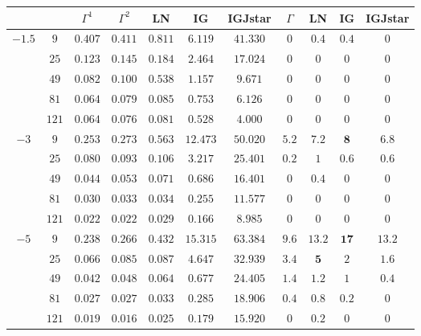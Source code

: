 \begin{table}[hbt]
\begin{tabular}{cc|ccccc|cccc}
		&  & $\Gamma^1$ & $\Gamma^2$ & LN & IG & IGJstar & $\Gamma$ & LN & IG & IGJstar  \\
		\midrule				
		\multirow{5 }{*}{$-1.5$} 
		 &  $9  $ 	&  	 $0.407$ 	&	 $0.411$ 	&	 $0.811$ 	&	 $6.119$  	&	 $41.330$ 	&	$0$	&	$0.4$	&	$0.4$	&	$0$ \\
		 &  $25 $ 	&  	 $0.123$ 	&	 $0.145$ 	&	 $0.184$ 	&	 $2.464$  	&	 $17.024$ 	&	$0$	&	$0$		&	$0$		&	$0$ \\
		 &  $49 $ 	&  	 $0.082$ 	&	 $0.100$ 	&	 $0.538$ 	&	 $1.157$  	&	 $9.671$ 	&	$0$	&	$0$		&	$0$		&	$0$ \\
		 &  $81 $ 	&  	 $0.064$ 	&	 $0.079$ 	&	 $0.085$ 	&	 $0.753$  	&	 $6.126$ 	&	$0$	&	$0$		&	$0$		&	$0$ \\
		 &  $121$ 	&  	 $0.064$ 	&	 $0.076$ 	&	 $0.081$ 	&	 $0.528$  	&	 $4.000$ 	&	$0$	&	$0$		&	$0$		&	$0$ \\
		\cmidrule(r){1-7}
		 \cmidrule(r){8-11}									
		 \multirow{5 }{*}{$-3$}	
		 &  $9  $ 	&  	 $0.253$ 	&	 $0.273$ 	&	 $0.563$ 	&	 $12.473$ 	&	 $50.020$ 	&	$5.2$&	$7.2$	& $\textbf{8}$	& $6.8$ \\
		 &  $25 $ 	&  	 $0.080$ 	&	 $0.093$ 	&	 $0.106$ 	&	 $3.217$  	&	 $25.401$ 	&	$0.2$ &	$1$		&	$0.6$		& $0.6$ \\
		 &  $49 $ 	&  	 $0.044$ 	&	 $0.053$ 	&	 $0.071$ 	&	 $0.686$  	&	 $16.401$ 	&	$0$	&	$0.4$		&	$0$		&	$0$ \\
		 &  $81 $ 	&  	 $0.030$ 	&	 $0.033$ 	&	 $0.034$ 	&	 $0.255$  	&	 $11.577$ 	&	$0$	&	$0$		&	$0$		&	$0$ \\
		 &  $121$ 	&  	 $0.022$ 	&	 $0.022$ 	&	 $0.029$ 	&	 $0.166$  	&	 $8.985$ 	&	$0$	&	$0$	    &	$0$		&	$0$ \\
		\cmidrule(r){1-7}
		\cmidrule(r){8-11}										
		 \multirow{5 }{*}{$-5$}	
		 &  $9  $ 	&  	 $0.238$ 	&	 $0.266$ 	&	 $0.432$ 	&	 $15.315$ 	&	 $63.384$ 	&	$9.6$	&	$13.2$		& $\textbf{17}$ 	&	$13.2$ \\
		 &  $25 $ 	&  	 $0.066$ 	&	 $0.085$ 	&	 $0.087$ 	&	 $4.647$  	&	 $32.939$ 	&	$3.4$	& $\textbf{5}$ 	&	$2$ 		&	$1.6$ \\
		 &  $49 $ 	&  	 $0.042$ 	&	 $0.048$ 	&	 $0.064$ 	&	 $0.677$  	&	 $24.405$ 	&	$1.4$		&	$1.2$			&	$1$			&	$0.4$ \\
		 &  $81 $ 	&  	 $0.027$ 	&	 $0.027$ 	&	 $0.033$ 	&	 $0.285$  	&	 $18.906$ 	&	$0.4$		&	$0.8$			&	$0.2$			&	$0$ \\
		 &  $121$ 	&  	 $0.019$ 	&	 $0.016$ 	&	 $0.025$ 	&	 $0.179$  	&	 $15.920$ 	&	$0$		&	$0.2$			&	$0$			&	$0$ \\
		\cmidrule(r){1-7}

\end{tabular}
\end{table}
